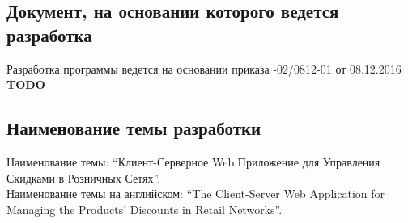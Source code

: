 \subsection{Документ, на основании которого ведется разработка}
Разработка программы ведется на основании приказа 
-02/0812-01 от 08.12.2016
\textbf{TODO}


\subsection{Наименование темы разработки}
Наименование темы: ``Клиент-Серверное Web Приложение для Управления Скидками в Розничных Сетях''. \\
Наименование темы на английском: ``The Client-Server Web Application for Managing the Products' Discounts in Retail Networks''. \\

